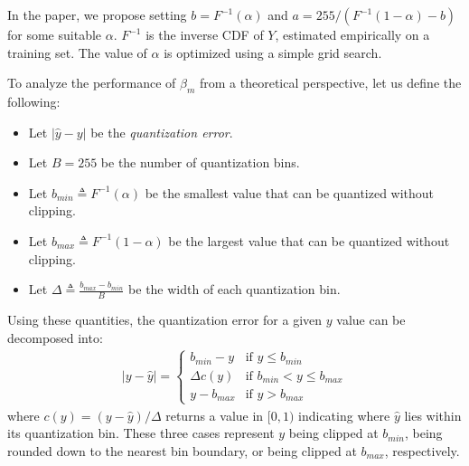 \documentclass[]{article}
\begin{document}
In the paper, we propose setting $b = F^{-1}(\alpha)$ and $a = 255 / (F^{-1}(1 - \alpha) - b)$ for some suitable $\alpha$. $F^{-1}$ is the inverse CDF of $Y$, estimated empirically on a training set. The value of $\alpha$ is optimized using a simple grid search.

To analyze the performance of $\beta_m$ from a theoretical perspective, let us define the following:
\begin{itemize}
\itemsep1.5mm
\item{Let $|\hat{y} - y|$ be the \textit{quantization error}. }
\item{Let $B = 255$ be the number of quantization bins.}
\item{Let $b_{min} \triangleq F^{-1}(\alpha)$ be the smallest value that can be quantized without clipping.}
\item{Let $b_{max} \triangleq F^{-1}(1 - \alpha)$ be the largest value that can be quantized without clipping.}
\item{Let $\Delta \triangleq \frac{b_{max} - b_{min} }{ B }$ be the width of each quantization bin.}
\end{itemize}

Using these quantities, the quantization error for a given $y$ value can be decomposed into:
\begin{align} \label{eq:decomposition}
    |y - \hat{y}| =
    \begin{cases}
        b_{min} - y         & \text{if } y \le b_{min} \\
        \Delta c(y)         & \text{if } b_{min} < y \le b_{max} \\
        y - b_{max}         & \text{if } y > b_{max}
    \end{cases}
\end{align}
where $c(y) = (y - \hat{y}) / \Delta$ returns a value in $[0, 1)$ indicating where $\hat{y}$ lies within its quantization bin. These three cases represent $y$ being clipped at $b_{min}$, being rounded down to the nearest bin boundary, or being clipped at $b_{max}$, respectively.
\end{document}
